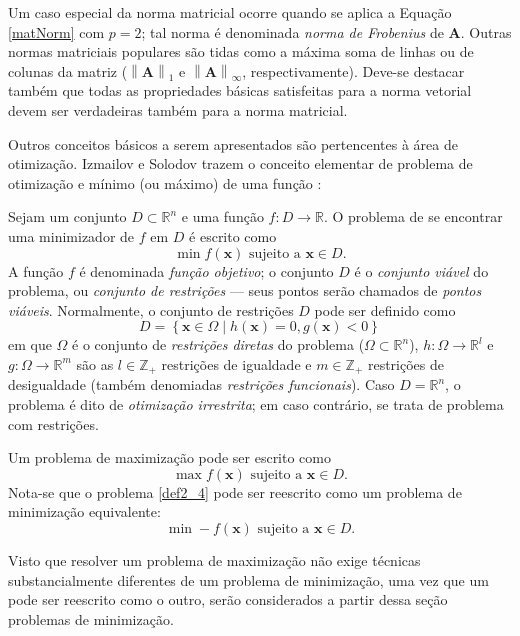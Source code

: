 Um caso especial da norma matricial ocorre quando se aplica a Equa\c{c}\~{a}o \eqref{matNorm} com $p = 2$; tal norma \'{e} denominada \textit{norma de Frobenius} de $\mathbf{A}$. Outras normas matriciais populares s\~{a}o tidas como a m\'{a}xima soma de linhas ou de colunas da matriz ($\left\|\mathbf{A}\right\|_{1}$ e $\left\|\mathbf{A}\right\|_{\infty}$, respectivamente). Deve-se destacar tamb\'{e}m que todas as propriedades b\'{a}sicas satisfeitas para a norma vetorial devem ser verdadeiras tamb\'{e}m para a norma matricial.

Outros conceitos b\'{a}sicos a serem apresentados s\~{a}o pertencentes \`{a} \'{a}rea de otimiza\c{c}\~{a}o. Izmailov e Solodov trazem o conceito elementar de problema de otimiza\c{c}\~{a}o e m\'{i}nimo (ou m\'{a}ximo) de uma fun\c{c}\~{a}o \cite{izmailov}:

\begin{definition} 
Sejam um conjunto $D \subset \mathbb{R}^{n}$ e uma fun\c{c}\~{a}o $f: D \to \mathbb{R}$. O problema de se encontrar uma minimizador de $f$ em $D$ \'{e} escrito como
\begin{equation}
\label{basicProb}
\min f(\mathbf{x}) \text{ sujeito a } \mathbf{x} \in D.
\end{equation} A fun\c{c}\~{a}o $f$ \'{e} denominada \textit{fun\c{c}\~{a}o objetivo}; o conjunto $D$ \'{e} o \textit{conjunto vi\'{a}vel} do problema, ou \textit{conjunto de restri\c{c}\~{o}es} --- seus pontos ser\~{a}o chamados de \textit{pontos vi\'{a}veis}. Normalmente, o conjunto de restri\c{c}\~{o}es $D$ pode ser definido como
\begin{equation}
D = \left\lbrace \mathbf{x} \in \Omega \mid h(\mathbf{x}) = 0, g(\mathbf{x}) < 0 \right\rbrace
\end{equation} em que $\Omega$ \'{e} o conjunto de \textit{restri\c{c}\~{o}es diretas} do problema ($\Omega \subset \mathbb{R}^{n}$), $h: \Omega \to \mathbb{R}^{l}$ e $g: \Omega \to \mathbb{R}^{m}$ s\~{a}o as $l \in \mathbb{Z}_{+}$ restri\c{c}\~{o}es de igualdade e $m \in \mathbb{Z}_{+}$ restri\c{c}\~{o}es de desigualdade (tamb\'{e}m denomiadas \textit{restri\c{c}\~{o}es funcionais}). Caso $D = \mathbb{R}^{n}$, o problema \'{e} dito de \textit{otimiza\c{c}\~{a}o irrestrita}; em caso contr\'{a}rio, se trata de problema com restri\c{c}\~{o}es.
\end{definition} 
\begin{definition} 
Um problema de maximiza\c{c}\~{a}o pode ser escrito como
\begin{equation}
\label{def2_4}
\max f(\mathbf{x}) \text{ sujeito a } \mathbf{x} \in D.
\end{equation} 
Nota-se que o problema \eqref{def2_4} pode ser reescrito como um problema de minimiza\c{c}\~{a}o equivalente:
\begin{equation*}
\min -f(\mathbf{x}) \text{ sujeito a } \mathbf{x} \in D.
\end{equation*}
\end{definition}  
Visto que resolver um problema de maximiza\c{c}\~{a}o n\~{a}o exige t\'{e}cnicas substancialmente diferentes de um problema de minimiza\c{c}\~{a}o, uma vez que um pode ser reescrito como o outro, ser\~{a}o considerados a partir dessa se\c{c}\~{a}o problemas de minimiza\c{c}\~{a}o.

